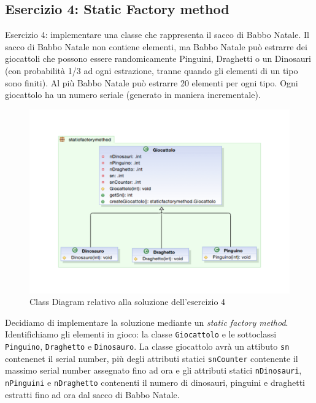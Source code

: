 \documentclass{article}
\begin{document}
\subsection{Esercizio 4: Static Factory method}
\begin{framed}
Esercizio 4: implementare una classe che rappresenta il sacco di Babbo Natale. Il sacco di Babbo Natale non contiene elementi, ma Babbo Natale pu\`o estrarre dei giocattoli che possono essere randomicamente  Pinguini, Draghetti o un Dinosauri (con probabilit\`a 1/3 ad ogni estrazione, tranne quando gli elementi di un tipo sono finiti). Al pi\`u Babbo Natale pu\`o estrarre 20 elementi per ogni tipo. Ogni giocattolo ha un numero seriale (generato in maniera incrementale).
\end{framed}

\begin{figure}[h]
\includegraphics[width=1\textwidth]{Img/StaticFactoryMethod.pdf}
\caption{Class Diagram relativo alla soluzione dell'esercizio 4}
\label{Fig:labirinto}
\end{figure}

Decidiamo di implementare la soluzione mediante un \emph{static factory method}. Identifichiamo gli elementi in gioco: la classe \texttt{Giocattolo} e le sottoclassi \texttt{Pinguino}, \texttt{Draghetto} e \texttt{Dinosauro}. La classe giocattolo avr\`a un attibuto \texttt{sn} contenenet il serial number, pi\`u degli attributi statici \texttt{snCounter} contenente il massimo serial number assegnato fino ad ora e gli attributi statici \texttt{nDinosauri}, \texttt{nPinguini} e \texttt{nDraghetto} contenenti il numero di dinosauri, pinguini e draghetti estratti fino ad ora dal sacco di Babbo Natale.
\end{document}
